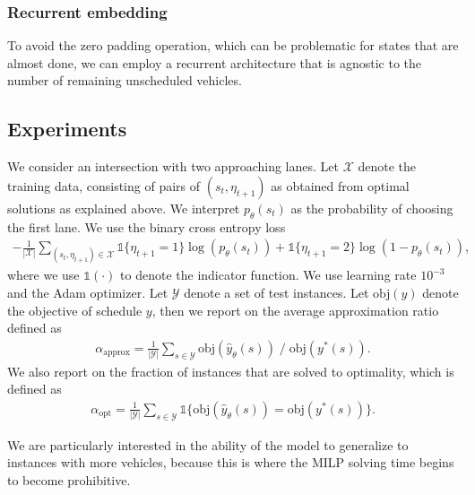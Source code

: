 \documentclass[a4paper]{article}
\theoremstyle{definition}
\theoremstyle{plain}
\begin{document}
\subsubsection*{Recurrent embedding}

To avoid the zero padding operation, which can be problematic for states that
are almost done, we can employ a recurrent architecture that is agnostic to the
number of remaining unscheduled vehicles.

\subsection*{Experiments}

We consider an intersection with two approaching lanes. Let $\mathcal{X}$ denote
the training data, consisting of pairs of $(s_{t}, \eta_{t+1})$ as obtained from
optimal solutions as explained above.
%
We interpret $p_{\theta}(s_{t})$ as the probability of choosing the first lane. We
use the binary cross entropy loss
\begin{align*}
  - \frac{1}{|\mathcal{X}|} \sum_{(s_{t}, \eta_{t+1}) \in \mathcal{X}} \mathds{1}\{\eta_{t+1} = 1\} \log(p_{\theta}(s_{t})) + \mathds{1}\{\eta_{t+1} = 2\} \log(1 - p_{\theta}(s_{t})) ,
\end{align*}
where we use $\mathds{1}(\cdot)$ to denote the indicator function.
We use learning rate $10^{-3}$ and the Adam optimizer.
%
Let $\mathcal{Y}$ denote a set of test instances.
Let $\text{obj}(y)$ denote the objective of schedule $y$, then
we report on the average approximation ratio defined as
\begin{align*}
  \alpha_{\text{approx}} = \frac{1}{|\mathcal{Y}|} \sum_{s \in \mathcal{Y}} \text{obj}(\hat{y}_{\theta}(s)) \; / \; \text{obj}(y^{*}(s)) .
\end{align*}
We also report on the fraction of instances that are solved to optimality, which
is defined as
\begin{align*}
  \alpha_{\text{opt}} = \frac{1}{|\mathcal{Y}|} \sum_{s \in \mathcal{Y}} \mathds{1}\{ \text{obj}(\hat{y}_{\theta}(s)) = \text{obj}(y^{*}(s)) \} .
\end{align*}

We are particularly interested in the ability of the model to generalize to
instances with more vehicles, because this is where the MILP solving time
begins to become prohibitive.

\end{document}
